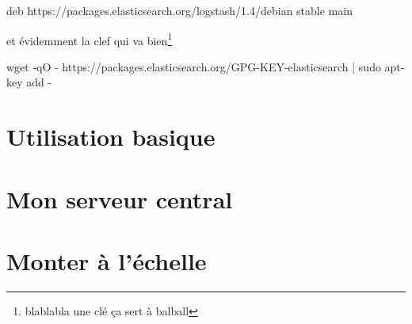 deb https://packages.elasticsearch.org/logstash/1.4/debian stable main

et évidemment la clef qui va bien\footnote{blablabla une clé ça sert à balball}

wget -qO - https://packages.elasticsearch.org/GPG-KEY-elasticsearch | sudo apt-key add -



\section{Utilisation basique}



\section{Mon serveur central}



\section{Monter à l'échelle}
